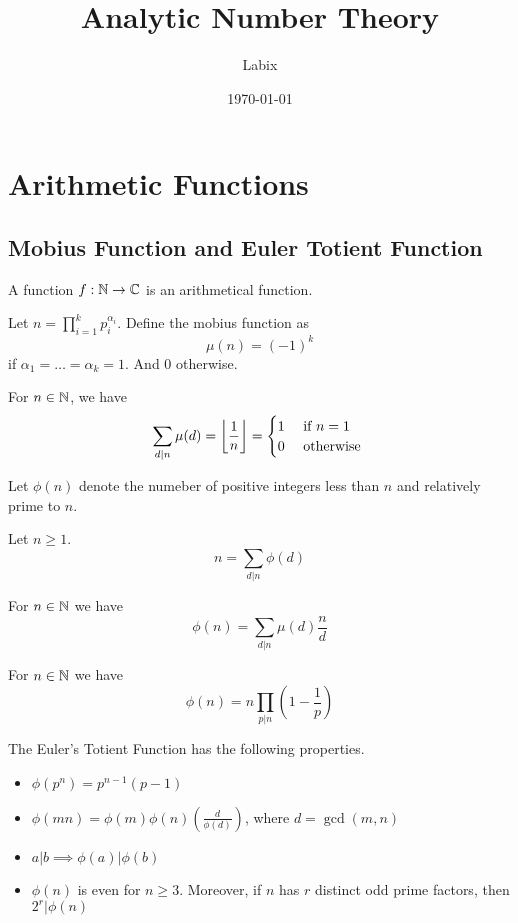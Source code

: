 \documentclass[a4paper]{article}
\title{Analytic Number Theory}
\author{Labix}
\date{\today}
\begin{document}
\maketitle
\begin{abstract}
\end{abstract}
\tableofcontents
\pagebreak

\section{Arithmetic Functions}
\subsection{Mobius Function and Euler Totient Function}
\begin{defn} A function $f:\N\to\C$ is an arithmetical function. 
\end{defn}

\begin{defn} Let $n=\prod_{i=1}^kp_i^{\alpha_i}$. Define the mobius function as $$\mu(n)=(-1)^k$$ if $\alpha_1=\dots=\alpha_k=1$. And $0$ otherwise.  
\end{defn}

\begin{thm} For $n\in\N$, we have $$\sum_{d|n}\mu(d)=\floor*{\frac{1}{n}}=\begin{cases}
1 & \text{ if }n=1\\
0 & \text{ otherwise }
\end{cases}$$
\end{thm}

\begin{defn} Let $\phi(n)$ denote the numeber of positive integers less than $n$ and relatively prime to $n$. 
\end{defn}

\begin{thm} Let $n\geq 1$. $$n=\sum_{d|n}\phi(d)$$
\end{thm}

\begin{thm} For $n\in\N$ we have $$\phi(n)=\sum_{d|n}\mu(d)\frac{n}{d}$$
\end{thm}

\begin{thm} For $n\in\N$ we have $$\phi(n)=n\prod_{p|n}\left(1-\frac{1}{p}\right)$$
\end{thm}

\begin{prp} The Euler's Totient Function has the following properties. 
\begin{itemize}
\item $\phi(p^n)=p^{n-1}(p-1)$
\item $\phi(mn)=\phi(m)\phi(n)\left(\frac{d}{\phi(d)}\right)$, where $d=\gcd(m,n)$
\item $a|b\implies\phi(a)|\phi(b)$
\item $\phi(n)$ is even for $n\geq 3$. Moreover, if $n$ has $r$ distinct odd prime factors, then $2^r|\phi(n)$
\end{itemize}
\end{prp}
\end{document}
